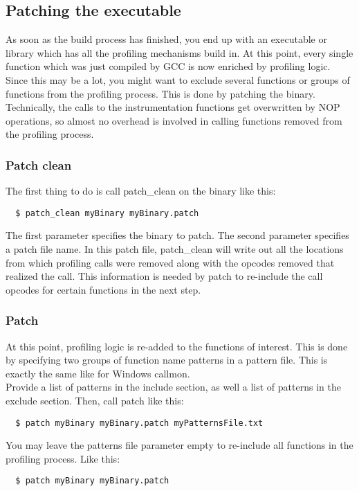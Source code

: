 \subsection{Patching the executable} As soon as the build process has finished, you end up with an executable or library which has all the profiling mechanisms build in. At this point, every single function which was just compiled by GCC is now enriched by profiling logic. Since this may be a lot, you might want to exclude several functions or groups of functions from the profiling process. This is done by patching the binary. Technically, the calls to the instrumentation functions get overwritten by NOP operations, so almost no overhead is involved in calling functions removed from the profiling process.

\subsubsection{Patch clean} The first thing to do is call patch\_clean on the binary like this:
\begin{verbatim}
  $ patch_clean myBinary myBinary.patch
\end{verbatim}
The first parameter specifies the binary to patch. The second parameter specifies a patch file name. In this patch file, patch\_clean will write out all the locations from which profiling calls were removed along with the opcodes removed that realized the call. This information is needed by patch to re-include the call opcodes for certain functions in the next step.

\subsubsection{Patch} At this point, profiling logic is re-added to the functions of interest. This is done by specifying two groups of function name patterns in a pattern file. This is exactly the same like for Windows callmon.\\

Provide a list of patterns in the include section, as well a list of patterns in the exclude section. Then, call patch like this:
\begin{verbatim}
  $ patch myBinary myBinary.patch myPatternsFile.txt
\end{verbatim}
You may leave the patterns file parameter empty to re-include all functions in the profiling process. Like this:
\begin{verbatim}
  $ patch myBinary myBinary.patch
\end{verbatim}

